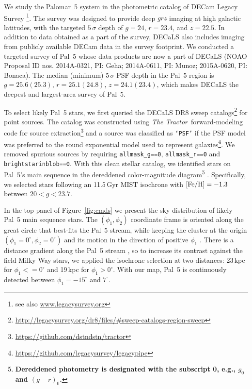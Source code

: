 \documentclass[twocolumn]{aastex62}
\newcommand{\tractor}{\textsl{The Tractor}}
\newcommand{\changes}[1]{{\textbf{#1}}}
\begin{document}
We study the Palomar~5 system in the photometric catalog of DECam Legacy Survey \citep[DECaLS, part of the DESI Legacy Imaging Surveys,][]{dey2019}\footnote{see also \url{www.legacysurvey.org}}.
The survey was designed to provide deep $grz$ imaging at high galactic latitudes, with the targeted $5\,\sigma$ depth of $g=24$, $r=23.4$, and $z=22.5$.
In addition to data obtained as a part of the survey, DECaLS also includes imaging from publicly available DECam data in the survey footprint.
We conducted a targeted survey of Pal~5 whose data products are now a part of DECaLS (NOAO Proposal ID nos. 2014A-0321, PI: Geha; 2014A-0611, PI: Munoz; 2015A-0620, PI: Bonaca).
The median (minimum) $5\,\sigma$ PSF depth in the Pal~5 region is $g=25.6(25.3)$, $r=25.1(24.8)$, $z=24.1(23.4)$, which makes DECaLS the deepest and largest-area survey of Pal~5.

To select likely Pal~5 stars, we first queried the DECaLS DR8 sweep catalogs\footnote{\url{http://legacysurvey.org/dr8/files/\#sweep-catalogs-region-sweep}} for point sources.
The catalog was constructed using \tractor\ forward-modeling code for source extraction\footnote{\url{https://github.com/dstndstn/tractor}} and a source was classified as \texttt{`PSF'} if the PSF model was preferred to the round exponential model used to represent galaxies\footnote{\url{https://github.com/legacysurvey/legacypipe}}.
We removed spurious sources by requiring \texttt{allmask\_g==0}, \texttt{allmask\_r==0} and \texttt{brightstarinblob==0}.
With this clean stellar catalog, we identified stars on Pal~5's main sequence in the dereddened color-magnitude diagram\footnote{\changes{Dereddened photometry is designated with the subscript 0, e.g., $g_0$ and $(g-r)_0$.}} \citep[using the re-calibrated SFD dust map;][]{Schlegel:1998, Schlafly:2011}.
Specifically, we selected stars following an 11.5\,Gyr MIST isochrone with $\rm [Fe/H] = -1.3$ \citep{Choi:2016} between $20<g<23.7$.

In the top panel of Figure~\ref{fig:cmds} we present the sky distribution of likely Pal~5 main sequence stars.
The $(\phi_1,\phi_2)$ coordinate frame is oriented along the great circle that best-fits the Pal~5 stream, while keeping the cluster at the origin $(\phi_1 = 0^\circ,\phi_2 = 0^\circ)$  and its motion in the direction of positive $\phi_1$ \citep{gala}.
There is a distance gradient along the Pal~5 stream \citep{Ibata:2016}, so to increase its contrast against the field Milky Way stars, we applied the isochrone selection at two distances: 23\,kpc for $\phi_1<=0^\circ$ and 19\,kpc for $\phi_1>0^\circ$.
With our map, Pal~5 is continuously detected between $\phi_1=-15^\circ$ and $7^\circ$.
\end{document}

